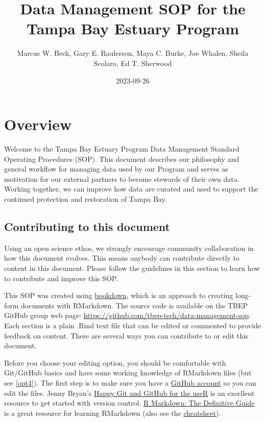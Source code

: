 \documentclass[
]{book}
\title{Data Management SOP for the Tampa Bay Estuary Program}
\author{Marcus W. Beck, Gary E. Raulerson, Maya C. Burke, Joe Whalen, Sheila Scolaro, Ed T. Sherwood}
\date{2023-09-26}
\begin{document}
\maketitle

{
\hypersetup{linkcolor=}
\setcounter{tocdepth}{1}
\tableofcontents
}
\hypertarget{overview}{%
\chapter{Overview}\label{overview}}

Welcome to the Tampa Bay Estuary Program Data Management Standard Operating Procedures (SOP). This document describes our philosophy and general workflow for managing data used by our Program and serves as motivation for our external partners to become stewards of their own data. Working together, we can improve how data are curated and used to support the continued protection and restoration of Tampa Bay.

\hypertarget{contrib}{%
\section{Contributing to this document}\label{contrib}}

Using an open science ethos, we strongly encourage community collaboration in how this document evolves. This means anybody can contribute directly to content in this document. Please follow the guidelines in this section to learn how to contribute and improve this SOP.

This SOP was created using \href{https://bookdown.org/}{bookdown}, which is an approach to creating long-form documents with RMarkdown. The source code is available on the TBEP GitHub group web page: \url{https://github.com/tbep-tech/data-management-sop}. Each section is a plain .Rmd text file that can be edited or commented to provide feedback on content. There are several ways you can contribute to or edit this document.

Before you choose your editing option, you should be comfortable with Git/GitHub basics and have some working knowledge of RMarkdown files (but see \ref{opt4}). The first step is to make sure you have a \href{https://github.com/join}{GitHub account} so you can edit the files. Jenny Bryan's \href{https://happygitwithr.com/}{Happy Git and GitHub for the useR} is an excellent resource to get started with version control. \href{https://bookdown.org/yihui/rmarkdown/}{R Markdown: The Definitive Guide} is a great resource for learning RMarkdown (also see the \href{https://rstudio.com/wp-content/uploads/2015/03/rmarkdown-reference.pdf}{cheatsheet}).
\end{document}
